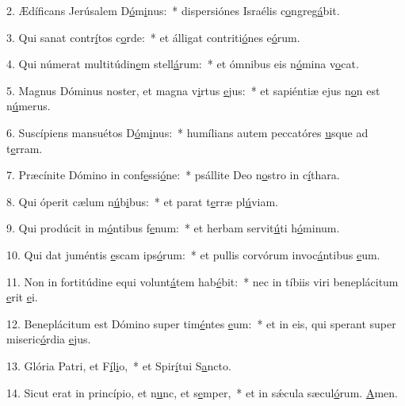 2. Ædíficans Jerúsalem D\uline{ó}m\uline{i}nus:~* dispersiónes Israélis c\uline{o}ngreg\uline{á}bit.\par 
3. Qui sanat contr\uline{í}tos c\uline{o}rde:~* et álligat contriti\uline{ó}nes e\uline{ó}rum.\par 
4. Qui númerat multitúdin\uline{e}m stell\uline{á}rum:~* et ómnibus eis n\uline{ó}mina v\uline{o}cat.\par 
5. Magnus Dóminus noster, et magna v\uline{i}rtus \uline{e}jus:~* et sapiéntiæ ejus n\uline{o}n est n\uline{ú}merus.\par 
6. Suscípiens mansuétos D\uline{ó}m\uline{i}nus:~* humílians autem peccatóres \uline{u}sque ad t\uline{e}rram.\par 
7. Præcínite Dómino in conf\uline{e}ssi\uline{ó}ne:~* psállite Deo n\uline{o}stro in c\uline{í}thara.\par 
8. Qui óperit cælum n\uline{ú}b\uline{i}bus:~* et parat t\uline{e}rræ pl\uline{ú}viam.\par 
9. Qui prodúcit in m\uline{ó}ntibus f\uline{e}num:~* et herbam servit\uline{ú}ti h\uline{ó}minum.\par 
10. Qui dat juméntis \uline{e}scam ips\uline{ó}rum:~* et pullis corvórum invoc\uline{á}ntibus \uline{e}um.\par 
11. Non in fortitúdine equi volunt\uline{á}tem hab\uline{é}bit:~* nec in tíbiis viri beneplácitum \uline{e}rit \uline{e}i.\par 
12. Beneplácitum est Dómino super tim\uline{é}ntes \uline{e}um:~* et in eis, qui sperant super miseric\uline{ó}rdia \uline{e}jus.\par 
13. Glória Patri, et F\uline{í}l\uline{i}o,~* et Spir\uline{í}tui S\uline{a}ncto.\par 
14. Sicut erat in princípio, et n\uline{u}nc, et s\uline{e}mper,~* et in sǽcula sæcul\uline{ó}rum. \uline{A}men.\par 
